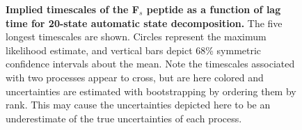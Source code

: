 
\begin{figure}[tb]
  \begin{center}
  \end{center}
  \caption{{\bf Implied timescales of the F$_s$ peptide as a function of lag time for 20-state automatic state decomposition.} 
   The five longest timescales are shown.  
   Circles represent the maximum likelihood estimate, and vertical bars depict 68\% symmetric confidence intervals about the mean.
   Note the timescales associated with two processes appear to cross, but are here colored and uncertainties are estimated with bootstrapping by ordering them by rank.
   This may cause the uncertainties depicted here to be an underestimate of the true uncertainties of each process.
  }
  \label{automatic:figure:fs-peptide-timescales}
\end{figure}

